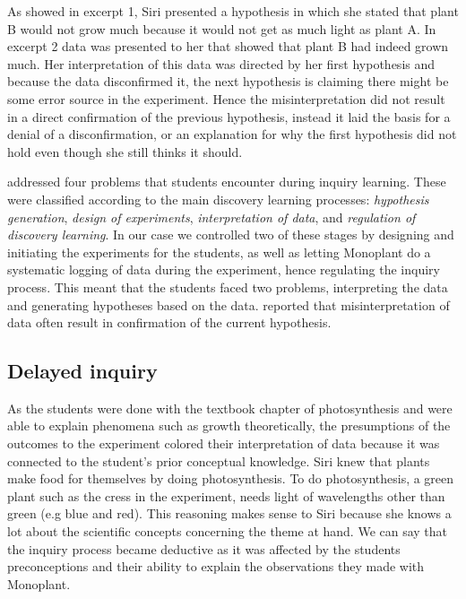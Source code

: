 As showed in excerpt 1, Siri presented a hypothesis in which she stated that plant B would not grow much because it would not get as much light as plant A. In excerpt 2 data was presented to her that showed that plant B had indeed grown much. Her interpretation of this data was directed by her first hypothesis and because the data disconfirmed it, the next hypothesis is claiming there might be some error source in the experiment. Hence the misinterpretation did not result in a direct confirmation of the previous hypothesis, instead it laid the basis for a denial of a disconfirmation, or an explanation for why the first hypothesis did not hold even though she still thinks it should.

\citet{de1998scientific} addressed four problems that students encounter during inquiry learning. These were classified according to the main discovery learning processes: \textit{hypothesis generation}, \textit{design of experiments}, \textit{interpretation of data}, and \textit{regulation of discovery learning}. In our case we controlled two of these stages by designing and initiating the experiments for the students, as well as letting Monoplant do a systematic logging of data during the experiment, hence regulating the inquiry process. This meant that the students faced two problems, interpreting the data and generating hypotheses based on the data. \citeauthor*{klahr1993heuristics} \citetext{\citeyear{klahr1993heuristics}, referenced in \citealp{de1998scientific}} reported that misinterpretation of data often result in confirmation of the current hypothesis. 

\subsection{Delayed inquiry}
As the students were done with the textbook chapter of photosynthesis and were able to explain  phenomena such as growth theoretically, the presumptions of the outcomes to the experiment colored their interpretation of data because it was connected to the student's prior conceptual knowledge. Siri knew that plants make food for themselves by doing photosynthesis. To do photosynthesis, a green plant such as the cress in the experiment, needs light of wavelengths other than green (e.g blue and red). This reasoning makes sense to Siri because she knows a lot about the scientific concepts concerning the theme at hand. We can say that the inquiry process became deductive as it was affected by the students preconceptions and their ability to explain the observations they made with Monoplant. 

